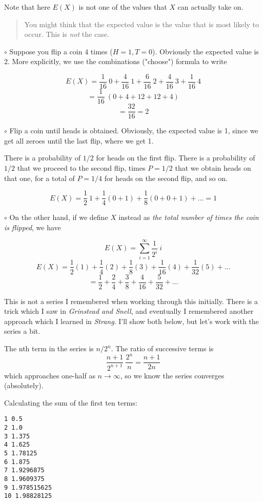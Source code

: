 \documentclass[11pt, oneside]{article}
\begin{document}
Note that here $E(X)$ is not one of the values that $X$ can actually take on.

\begin{quote}\color{blue}You might think that the expected value is the value that is most likely to occur.  This is \emph{not} the case.\color{black}\end{quote}

$\circ$ Suppose you flip a coin 4 times ($H = 1, T = 0$).  Obviously the expected value is 2.  More explicitly, we use the combinations ("choose") formula to write

\[ E(X) = \frac{1}{16} \ 0 + \frac{4}{16} \ 1 + \frac{6}{16} \ 2 + \frac{4}{16} \ 3 + \frac{1}{16} \ 4 \]
\[ = \frac{1}{16} \ (0 + 4 + 12 + 12 + 4) \]
\[ = \frac{32}{16} = 2 \]

$\circ$ Flip a coin until heads is obtained.  Obviously, the expected value is 1, since we get all zeroes until the last flip, where we get 1. 

There is a probability of $1/2$ for heads on the first flip.  There is a probability of $1/2$ that we proceed to the second flip, times $P=1/2$ that we obtain heads on that one, for a total of $P = 1/4$ for heads on the second flip, and so on.

\[ E(X) = \frac{1}{2} \ 1 + \frac{1}{4} (0 + 1) +  \frac{1}{8}(0 + 0 + 1) + \dots = 1 \]

$\circ$ On the other hand, if we define $X$ instead as \emph{the total number of times the coin is flipped}, we have

\[ E(X) = \sum_{i=1}^{\infty} \frac{1}{2^i} \ i \]
\[ E(X) = \frac{1}{2} (1) + \frac{1}{4} (2) +  \frac{1}{8}(3) +  \frac{1}{16}(4) +  \frac{1}{32}(5) + \dots \]
\[ = \frac{1}{2} + \frac{2}{4} + \frac{3}{8} + \frac{4}{16} + \frac{5}{32} + \dots \]

This is not a series I remembered when working through this initially.  There is a trick which I saw in \emph{Grinstead and Snell}, and eventually I remembered another approach which I learned in \emph{Strang}. I'll show both below, but let's work with the series a bit.

The nth term in the series is $n/2^n$.  The ratio of successive terms is
\[ \frac{n+1}{2^{n+1}} \ \frac{2^n}{n} = \frac{n+1}{2n} \]
which approaches one-half as $n \rightarrow \infty$, so we know the series converges (absolutely).

Calculating the sum of the first ten terms:

\begin{verbatim}
1 0.5
2 1.0
3 1.375
4 1.625
5 1.78125
6 1.875
7 1.9296875
8 1.9609375
9 1.978515625
10 1.98828125
\end{verbatim}
\end{document}
